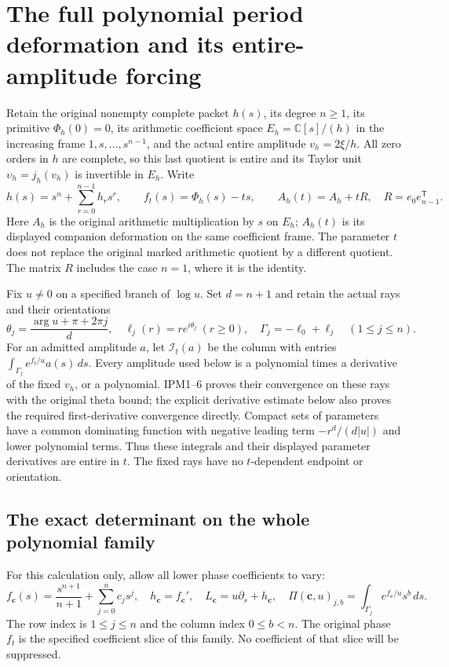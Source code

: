 \section{The full polynomial period deformation and its entire-amplitude forcing}
\label{GraphV3:sec:pde-full-deformation}

Retain the original nonempty complete packet $h(s)$, its degree $n\geq1$,
its primitive $\Phi_h(0)=0$, its arithmetic coefficient space
$E_h=\mathbb{C}[s]/(h)$ in the increasing frame $1,s,\ldots,s^{n-1}$,
and the actual entire amplitude $v_h=2\xi/h$. All zero orders in $h$
are complete, so this last quotient is entire and its Taylor unit
$\upsilon_h=j_h(v_h)$ is invertible in $E_h$. Write
\[
 h(s)=s^n+\sum_{r=0}^{n-1}h_rs^r,\qquad
 f_t(s)=\Phi_h(s)-ts,\qquad
 A_h(t)=A_h+tR,\quad R=e_0e_{n-1}^{\mathsf T}.
 \tag{PDE1}
\]
Here $A_h$ is the original arithmetic multiplication by $s$ on $E_h$;
$A_h(t)$ is its displayed companion deformation on the same coefficient
frame. The parameter $t$ does not replace the original marked arithmetic
quotient by a different quotient. The matrix $R$ includes the case
$n=1$, where it is the identity.

Fix $u\ne0$ on a specified branch of $\log u$. Set $d=n+1$ and retain
the actual rays and their orientations
\[
 \theta_j=\frac{\arg u+\pi+2\pi j}{d},\quad
 \ell_j(r)=re^{i\theta_j}\ (r\geq0),\quad
 \Gamma_j=-\ell_0+\ell_j\quad(1\leq j\leq n).
 \tag{PDE2}
\]
For an admitted amplitude $a$, let $\mathcal I_t(a)$ be the column with
entries $\int_{\Gamma_j}e^{f_t/u}a(s)\,ds$. Every amplitude used below is
a polynomial times a derivative of the fixed $v_h$, or a polynomial.
IPM1--6 proves their convergence on these rays with the original theta
bound; the explicit derivative estimate below also proves the required
first-derivative convergence directly. Compact sets of parameters have
a common dominating function with negative leading term
$-r^d/(d|u|)$ and lower polynomial terms. Thus these integrals and their
displayed parameter derivatives are entire in $t$. The fixed rays have
no $t$-dependent endpoint or orientation.

\subsection{The exact determinant on the whole polynomial family}

For this calculation only, allow all lower phase coefficients to vary:
\[
 f_{\mathbf c}(s)=\frac{s^{n+1}}{n+1}+\sum_{j=0}^n c_js^j,
 \quad h_{\mathbf c}=f_{\mathbf c}',\quad
 L_{\mathbf c}=u\partial_s+h_{\mathbf c},\quad
 \Pi(\mathbf c,u)_{j,b}
       =\int_{\Gamma_j}e^{f_{\mathbf c}/u}s^b\,ds.
 \tag{PDE3}
\]
The row index is $1\leq j\leq n$ and the column index $0\leq b<n$.
The original phase $f_t$ is the specified coefficient slice of this
family. No coefficient of that slice will be suppressed.

